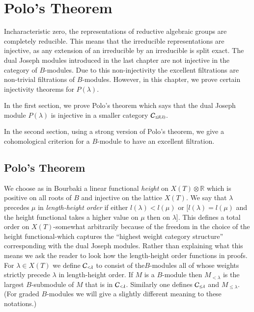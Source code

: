 \chapter{Polo's Theorem}\label{chap3}

In\pageoriginale characteristic\label{page22} zero, the
representations of reductive 
algebraic groups are completely reducible. This means that the
irreducible representations are injective, as any extension of an
irreducible by an irreducible is split exact. The dual Joseph modules
introduced in the last chapter are not injective in the category of
$B$-modules. Due to this non-injectivity the excellent filtrations are
non-trivial filtrations of $B$-modules. However, in this chapter, we
prove certain injectivity theorems for $P(\lambda)$.

In the first section, we prove Polo's theorem which says that the dual
Joseph module $P(\lambda)$ is injective in a smaller category
$\mathcal{C}_{\leq l(\lambda)}$.

In the second section, using a strong version of Polo's theorem, we
give a cohomological criterion for a $B$-module to have an excellent
filtration. 

\section{Polo's Theorem}\label{chap3-sec3.1}

We choose as in Bourbaki a linear functional {\em height} on
$X(T)\otimes \mathbb{R}$ which is positive on all roots of $B$ and
injective on the lattice $X(T)$. We say that $\lambda$ precedes $\mu$
in {\em length-height order} 
if either $l(\lambda)<l(\mu)$ or
$[l(\lambda)=l(\mu)$ and the height functional takes a higher value on
  $\mu$ then on $\lambda$]. This defines a total order on
$X(T)$-somewhat arbitrarily because of the freedom in the choice of
the height functional-which captures the ``highest weight category
structure'' corresponding with the dual Joseph modules. Rather than
explaining what this means we ask the reader to look how the
length-height order functions in proofs. For $\lambda\in X(T)$ we
define $\mathcal{C}_{<\lambda}$ to consist of the\pageoriginale $B$-modules\label{page23} all
of whose weights strictly precede $\lambda$ in length-height order. If
$M$ is a $B$-module then $M_{<\lambda}$ is the largest $B$-submodule
of $M$ that is in $\mathcal{C}_{<\lambda}$. Similarly one defines $\mathcal{C}_{\leq
  \lambda}$ and $M_{\leq \lambda}$. (For graded $B$-modules we will
give a slightly different meaning to these notations.)

